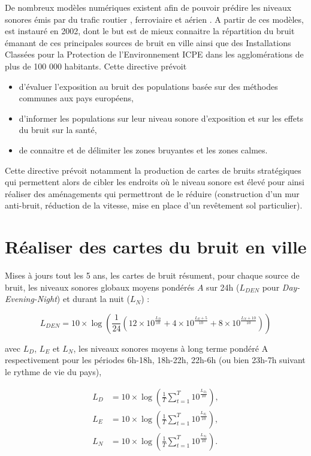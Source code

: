 De nombreux modèles numériques existent afin de pouvoir prédire les niveaux sonores émis par du trafic routier \cite{quartieri2009review}, ferroviaire \cite{van2000railway} et aérien \cite{zaporozhets1998aircraft}.
A partir de ces modèles, est instauré en 2002, dont le but est de mieux connaitre la répartition du bruit émanant de ces principales sources de bruit en ville ainsi que des Installations Classées pour la Protection de l'Environnement ICPE dans les agglomérations de plus de 100 000 habitants. Cette directive prévoit

\begin{itemize}
	\item d'évaluer l'exposition au bruit des populations basée sur des méthodes communes aux pays européens,
	\item d'informer les populations sur leur niveau sonore d'exposition et sur les effets du bruit sur la santé,
	\item de connaitre et de délimiter les zones bruyantes et les zones calmes.\\
\end{itemize}

Cette directive prévoit notamment la production de cartes de bruits stratégiques qui permettent alors de cibler les endroits où le niveau sonore est élevé pour ainsi réaliser des aménagements qui permettront de le réduire (construction d'un mur anti-bruit, réduction de la vitesse, mise en place d'un revêtement sol particulier).


\section{Réaliser des cartes du bruit en ville}
Mises à jours tout les 5 ans, les cartes de bruit résument, pour chaque source de bruit, les niveaux sonores globaux moyens pondérés $A$ sur 24h ($L_{DEN}$ pour \textit{Day-Evening-Night}) et durant la nuit ($L_N$) : 

\begin{equation}
L_{DEN} = 10\times\log \left(\frac{1}{24} \left(12\times10^{\frac{L_D}{10}}+4\times10^{\frac{L_E+5}{10}}+8\times10^{\frac{L_N+10}{10}} \right)\right)
\end{equation} 

avec $L_D$, $L_E$ et $L_N$, les niveaux sonores moyens à long terme pondéré A respectivement pour les périodes 6h-18h, 18h-22h, 22h-6h (ou bien 23h-7h suivant le rythme de vie du pays), 

\begin{subequations}
\begin{align}
L_D &= 10\times\log\left(\frac{1}{T} \sum_{t = 1}^{T}10^{\frac{L_{D_t}}{10}}\right),\\
L_E &= 10\times\log\left(\frac{1}{T} \sum_{t = 1}^{T}10^{\frac{L_{E_t}}{10}}\right),\\
L_N &= 10\times\log\left(\frac{1}{T} \sum_{t = 1}^{T}10^{\frac{L_{N_t}}{10}}\right).
\end{align}
\end{subequations}

